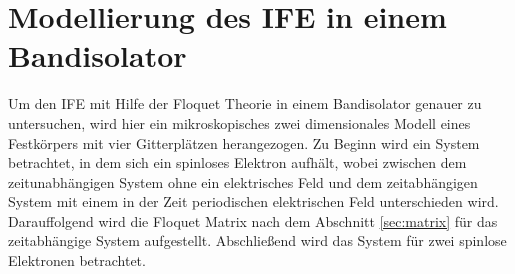 \chapter{Modellierung des IFE in einem Bandisolator}
\label{sec:model}
Um den IFE mit Hilfe der Floquet Theorie in
einem Bandisolator genauer zu untersuchen, wird hier ein
mikroskopisches zwei dimensionales Modell
eines Festkörpers mit vier Gitterplätzen herangezogen. Zu Beginn
wird ein System betrachtet, in dem sich ein spinloses
Elektron aufhält, wobei zwischen dem
zeitunabhängigen System ohne ein elektrisches Feld
und dem zeitabhängigen System mit einem in der Zeit
periodischen elektrischen Feld unterschieden wird.
Darauffolgend wird die Floquet Matrix nach dem Abschnitt
\ref{sec:matrix} für das
zeitabhängige System aufgestellt. Abschließend wird das
System für zwei spinlose Elektronen betrachtet.


